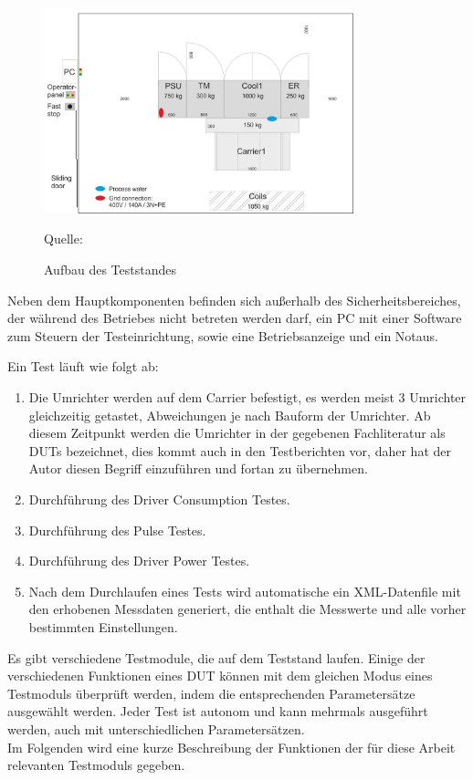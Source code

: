 \begin{figure}[h]
    \centering
    \includegraphics[width=0.8\textwidth]{Grafiken/Test Cabin.jpg}
    \caption{Aufbau des Teststandes}
    \label{fig:1. Aufbau des Teststandes}
    {Quelle: \cite*[7]{Main_Manuel_USTB2018}}
\end{figure}


Neben dem Hauptkomponenten befinden sich außerhalb des Sicherheitsbereiches, der während des Betriebes nicht betreten werden darf,
ein PC mit einer Software zum Steuern der Testeinrichtung, sowie eine Betriebsanzeige und ein Notaus. \cite*{Main_Manuel_USTB2018}

\newpage

Ein Test läuft wie folgt ab:

\begin{enumerate}
\item Die Umrichter werden auf dem Carrier befestigt, es werden meist 3 Umrichter gleichzeitig getastet, Abweichungen je nach Bauform der Umrichter.
Ab diesem Zeitpunkt werden die Umrichter in der gegebenen Fachliteratur als \ac{DUTs} bezeichnet, dies kommt auch in den Testberichten vor, daher hat der Autor diesen Begriff einzuführen und fortan zu übernehmen.


\item Durchführung des Driver Consumption Testes.


\item Durchführung des Pulse Testes.


\item Durchführung des Driver Power Testes.


\item Nach dem Durchlaufen eines Tests wird automatische ein XML-Datenfile mit den erhobenen Messdaten generiert, die enthalt die Messwerte und alle vorher bestimmten Einstellungen.


\end{enumerate}
Es gibt verschiedene Testmodule, die auf dem Teststand laufen.
Einige der verschiedenen Funktionen eines DUT können mit dem gleichen Modus eines Testmoduls überprüft werden, indem die entsprechenden Parametersätze ausgewählt werden.
Jeder Test ist autonom und kann mehrmals ausgeführt werden, auch mit unterschiedlichen Parametersätzen.
\\
Im Folgenden wird eine kurze Beschreibung der Funktionen der für diese Arbeit relevanten Testmoduls gegeben.

